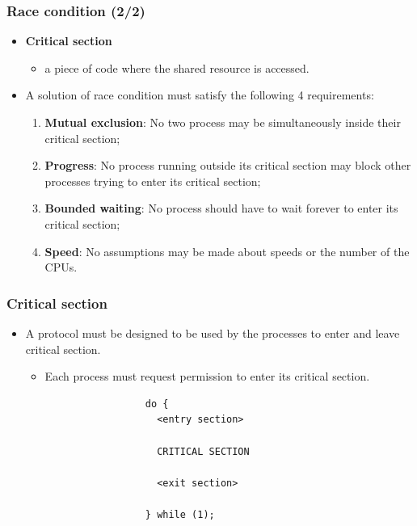 \documentclass[CJKutf8,xcolor=pdftex,dvipsnames,table]{beamer}
\begin{document}
\begin{CJK*}{UTF8}{song}
  \begin{frame}
  \frametitle{Race condition (2/2)} \pause
  \begin{itemize}
  \item{\textbf{Critical section}} \pause
    \begin{itemize}
    \item{a piece of code where the shared resource is accessed.} \pause
    \end{itemize}
  \item{A solution of race condition must satisfy the following 4 requirements:} \pause
    \begin{enumerate}
    \item{\textbf{Mutual exclusion}: No two process may be simultaneously inside their critical section;} \pause
    \item{\textbf{Progress}: No process running outside its critical section may block other processes trying to enter its critical section;} \pause
    \item{\textbf{Bounded waiting}: No process should have to wait forever to enter its critical section;} \pause
    \item{\textbf{Speed}: No assumptions may be made about speeds or the number of the CPUs.}
    \end{enumerate}
  \end{itemize}
  \end{frame}

  \begin{frame}[fragile]
  \frametitle{Critical section} \pause
  \begin{itemize}
  \item{A protocol must be designed to be used by the processes to enter and leave critical section.} \pause
    \begin{itemize}
    \item{Each process must request permission to enter its critical section.} \pause
    \end{itemize}
  \end{itemize}

\begin{lstlisting}
                        do {
                          <entry section>

                          CRITICAL SECTION

                          <exit section>

                        } while (1);
\end{lstlisting}


\end{frame}
\end{CJK*}
\end{document}
